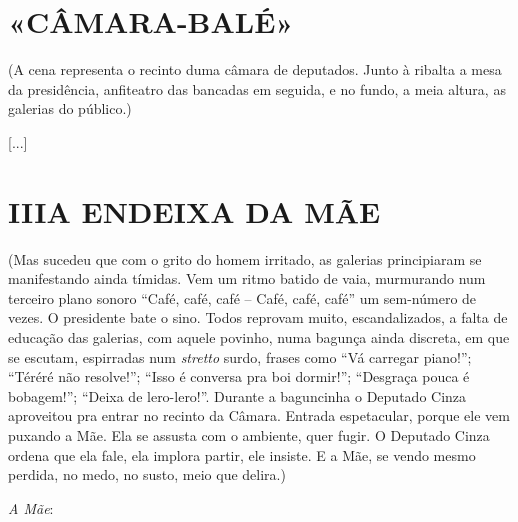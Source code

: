 \section{«CÂMARA-BALÉ»}

\hfill\parbox{150pt}{(A cena representa o recinto duma câmara de
deputados. Junto à ribalta a mesa da
presidência, anfiteatro das bancadas em
seguida, e no fundo, a meia altura, as galerias do público.)}

{[}...{]}

\section{III\break A ENDEIXA DA MÃE}

\hfill\parbox{150pt}{
(Mas sucedeu que com o grito do homem irritado, as galerias principiaram
se manifestando ainda tímidas. Vem um ritmo batido de vaia, murmurando
num terceiro plano sonoro ``Café, café, café -- Café, café, café'' um
sem-número de vezes. O presidente bate o sino. Todos reprovam muito,
escandalizados, a falta de educação das galerias, com aquele povinho,
numa bagunça ainda discreta, em que se escutam, espirradas num
\emph{stretto} surdo, frases como ``Vá carregar piano!''; ``Téréré não
resolve!''; ``Isso é conversa pra boi dormir!''; ``Desgraça pouca é
bobagem!''; ``Deixa de lero-lero!''. Durante a baguncinha o Deputado
Cinza aproveitou pra entrar no recinto da Câmara. Entrada espetacular,
porque ele vem puxando a Mãe. Ela se assusta com o ambiente, quer fugir.
O Deputado Cinza ordena que ela fale, ela implora partir, ele insiste. E
a Mãe, se vendo mesmo perdida, no medo, no susto, meio que delira.)
}

\emph{A Mãe}:

